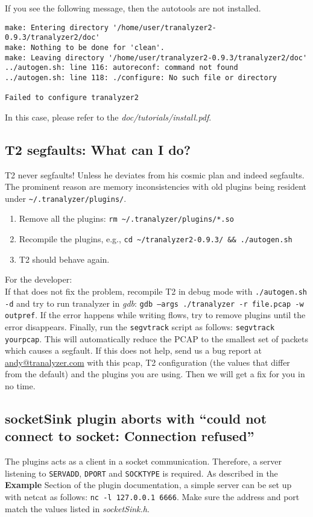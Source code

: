\documentclass[documentation]{subfiles}
\begin{document}
If you see the following message, then the autotools are not installed.
\begin{verbatim}
make: Entering directory '/home/user/tranalyzer2-0.9.3/tranalyzer2/doc'
make: Nothing to be done for 'clean'.
make: Leaving directory '/home/user/tranalyzer2-0.9.3/tranalyzer2/doc'
../autogen.sh: line 116: autoreconf: command not found
../autogen.sh: line 118: ./configure: No such file or directory

Failed to configure tranalyzer2
\end{verbatim}
In this case, please refer to the {\em doc/tutorials/install.pdf}.

\subsection{T2 segfaults: What can I do?}
T2 never segfaults!
Unless he deviates from his cosmic plan and indeed segfaults.
The prominent reason are memory inconsistencies with old plugins being resident under {\tt\textasciitilde{}/.tranalyzer/plugins/}.
\begin{enumerate}
    \item Remove all the plugins: {\tt rm \textasciitilde{}/.tranalyzer/plugins/*.so}
    \item Recompile the plugins, e.g., {\tt cd \textasciitilde{}/tranalyzer2-0.9.3/ \&\& ./autogen.sh}
    \item T2 should behave again.
\end{enumerate}
For the developer: \\
If that does not fix the problem, recompile T2 in debug mode with {\tt ./autogen.sh -d} and try to run tranalyzer in {\em gdb}: {\tt gdb --args ./tranalyzer -r file.pcap -w outpref}.
If the error happens while writing flows, try to remove plugins until the error disappears.
Finally, run the {\tt segvtrack} script as follows: {\tt segvtrack yourpcap}.
This will automatically reduce the PCAP to the smallest set of packets which causes a segfault.
If this does not help, send us a bug report at \href{mailto:andy@tranalyzer.com}{andy@tranalyzer.com} with this pcap, T2 configuration (the values that differ from the default) and the plugins you are using.
Then we will get a fix for you in no time.

\subsection{socketSink plugin aborts with ``could not connect to socket: Connection refused''}
The  plugins acts as a client in a socket communication.
Therefore, a server listening to {\tt SERVADD}, {\tt DPORT} and {\tt SOCKTYPE} is required.
As described in the {\bf Example} Section of the  plugin documentation,
a simple server can be set up with netcat as follows: {\tt nc -l 127.0.0.1 6666}.
Make sure the address and port match the values listed in {\em socketSink.h}.
\end{document}
